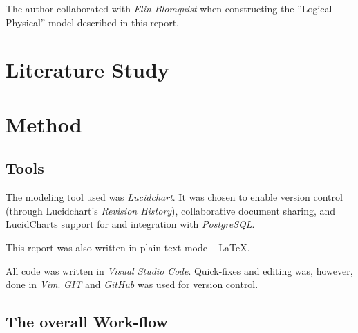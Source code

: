 \documentclass[a4paper]{scrartcl}
\begin{document}
The author collaborated with
\emph{Elin Blomquist}
when constructing the ''Logical-Physical'' model described in this report.


\section{Literature Study}

\clearpage
\section{Method}
\label{sec:method}


\subsection*{Tools}
The modeling tool used was \emph{Lucidchart}.
It was chosen to enable version control (through Lucidchart's \emph{Revision History}),
collaborative document sharing, and LucidCharts support for and integration with
\emph{PostgreSQL}.

This report was also written in plain text mode -- \LaTeX.

All code was written in \emph{Visual Studio Code}.
Quick-fixes and editing was, however, done in \emph{Vim}. 
\emph{GIT} and \emph{GitHub} was used for version control.

\subsection*{The overall Work-flow}
\end{document}

